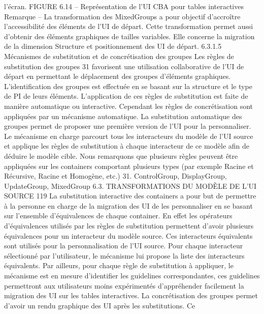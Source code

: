 \documentclass{article}
\begin{document}
l’\'{e}cran.
FIGURE 6.14 – Repr\'{e}sentation de l’UI CBA pour tables interactives
Remarque
– La transformation des MixedGroups a pour objectif d’accro\^{i}tre l’accessibilit\'{e} des \'{e}l\'{e}ments de
l’UI de d\'{e}part. Cette transformation permet aussi d’obtenir des \'{e}l\'{e}ments graphiques de tailles
variables. Elle concerne la migration de la dimension Structure et positionnement des UI de
d\'{e}part.
6.3.1.5
M\'{e}canismes de substitution et de concr\'{e}tisation des groupes
Les r\`{e}gles de substitution des groupes 31 favorisent une utilisation collaborative de l’UI de d\'{e}part
en permettant le d\'{e}placement des groupes d’\'{e}l\'{e}ments graphiques. L’identiﬁcation des groupes est
effectu\'{e}e en se basant sur la structure et le type de PI de leurs \'{e}l\'{e}ments.
L’application de ces r\`{e}gles de substitution est faite de mani\`{e}re automatique ou interactive. Cependant les r\`{e}gles de concr\'{e}tisation sont appliqu\'{e}es par un m\'{e}canisme automatique.
La substitution automatique des groupes
permet de proposer une premi\`{e}re version de l’UI pour
la personnaliser. Le m\'{e}canisme en charge parcourt tous les interacteurs du mod\`{e}le de l’UI source et
applique les r\`{e}gles de substitution \`{a} chaque interacteur de ce mod\`{e}le aﬁn de d\'{e}duire le mod\`{e}le cible.
Nous remarquons que plusieurs r\`{e}gles peuvent \^{e}tre appliqu\'{e}es sur les containers comportant plusieurs
types (par exemple Racine et R\'{e}cursive, Racine et Homog\`{e}ne, etc.)
31. ControlGroup, DisplayGroup, UpdateGroup, MixedGroup
6.3. TRANSFORMATIONS DU MODÈLE DE L’UI SOURCE
119
La substitution interactive des containers
a pour but de permettre \`{a} la personne en charge de la
migration des UI de les personnaliser en se basant sur l’ensemble d’\'{e}quivalences de chaque container.
En effet les op\'{e}rateurs d’\'{e}quivalences utilis\'{e}s par les r\`{e}gles de substitution permettent d’avoir plusieurs \'{e}quivalences pour un interacteur du mod\`{e}le source. Ces interacteurs \'{e}quivalents sont utilis\'{e}s
pour la personnalisation de l’UI source. Pour chaque interacteur s\'{e}lectionn\'{e} par l’utilisateur, le m\'{e}canisme lui propose la liste des interacteurs \'{e}quivalents. Par ailleurs, pour chaque r\`{e}gle de substitution
\`{a} appliquer, le m\'{e}canisme est en mesure d’identiﬁer les guidelines correspondantes, ces guidelines
permettront aux utilisateurs moins exp\'{e}riment\'{e}s d’appr\'{e}hender facilement la migration des UI sur les
tables interactives.
La concr\'{e}tisation des groupes
permet d’avoir un rendu graphique des UI apr\`{e}s les substitutions. Ce
\end{document}
